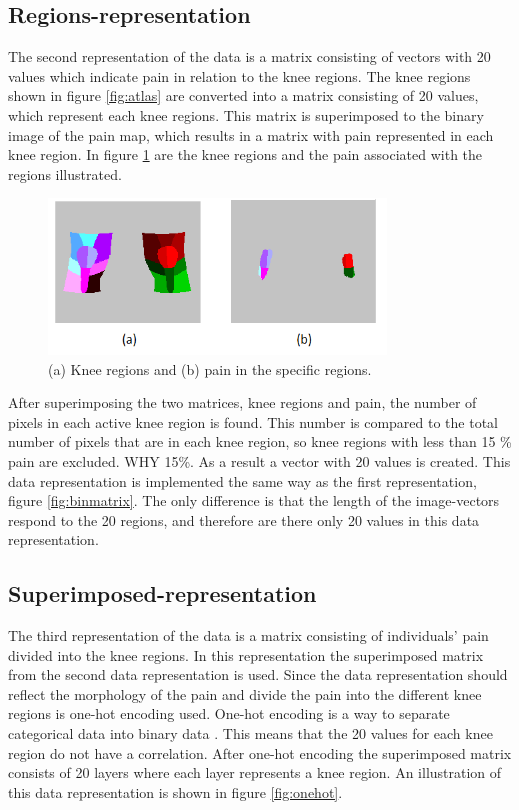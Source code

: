 \subsection{Regions-representation}
The second representation of the data is a matrix consisting of vectors with 20 values which indicate pain in relation to the knee regions.
The knee regions shown in figure \ref{fig:atlas} are converted into a matrix consisting of 20 values, which represent each knee regions. This matrix is superimposed to the binary image of the pain map, which results in a matrix with pain represented in each knee region. In figure \ref{fig:binregions} are the knee regions and the pain associated with the regions illustrated.

\begin{figure} [H]
\centering
\includegraphics[width=0.8\textwidth]{figures/binregions}
\caption{(a) Knee regions and (b) pain in the specific regions.}
\label{fig:binregions}
\end{figure}

\noindent
After superimposing the two matrices, knee regions and pain, the number of pixels in each active knee region is found. This number is compared to the total number of pixels that are in each knee region, so knee regions with less than 15 \% pain are excluded. WHY 15\%. As a result a vector with 20 values is created. This data representation is implemented the same way as the first representation, figure \ref{fig:binmatrix}. The only difference is that the length of the image-vectors respond to the 20 regions, and therefore are there only 20 values in this data representation.


\subsection{Superimposed-representation}
The third representation of the data is a matrix consisting of individuals’ pain divided into the knee regions.
\noindent
In this representation the superimposed matrix from the second data representation is used. Since the data representation should reflect the morphology of the pain and divide the pain into the different knee regions is one-hot encoding used. One-hot encoding is a way to separate categorical data into binary data \citep{Harris2012}. This means that the 20 values for each knee region do not have a correlation. After one-hot encoding the superimposed matrix consists of 20 layers where each layer represents a knee region. An illustration of this data representation is shown in figure \ref{fig:onehot}.


